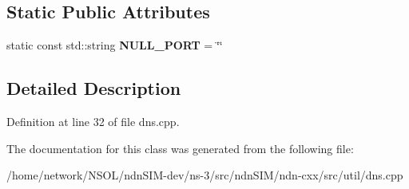 \subsection*{Static Public Attributes}
\begin{DoxyCompactItemize}
\item 
static const std\+::string {\bfseries N\+U\+L\+L\+\_\+\+P\+O\+RT} = \char`\"{}\char`\"{}\hypertarget{classndn_1_1dns_1_1Resolver_a11cbc8a1c19edd7c4cfca4489025912c}{}\label{classndn_1_1dns_1_1Resolver_a11cbc8a1c19edd7c4cfca4489025912c}

\end{DoxyCompactItemize}


\subsection{Detailed Description}


Definition at line 32 of file dns.\+cpp.



The documentation for this class was generated from the following file\+:\begin{DoxyCompactItemize}
\item 
/home/network/\+N\+S\+O\+L/ndn\+S\+I\+M-\/dev/ns-\/3/src/ndn\+S\+I\+M/ndn-\/cxx/src/util/dns.\+cpp\end{DoxyCompactItemize}

